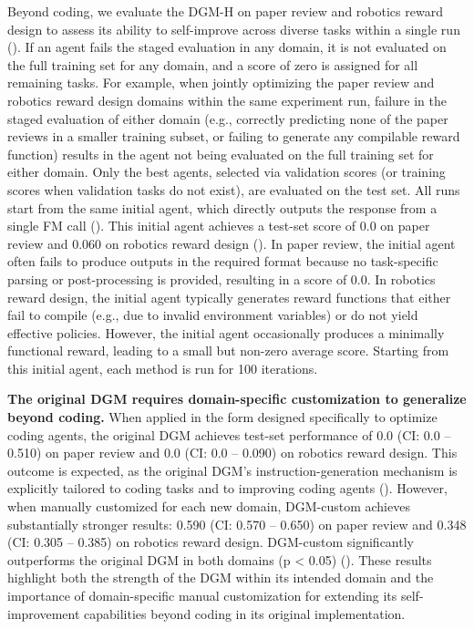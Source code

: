 \documentclass[]{fairmeta}
\begin{document}
Beyond coding, we evaluate the DGM-H on paper review and robotics reward design to assess its ability to self-improve across diverse tasks within a single run (). If an agent fails the staged evaluation in any domain, it is not evaluated on the full training set for any domain, and a score of zero is assigned for all remaining tasks. For example, when jointly optimizing the paper review and robotics reward design domains within the same experiment run, failure in the staged evaluation of either domain (e.g., correctly predicting none of the paper reviews in a smaller training subset, or failing to generate any compilable reward function) results in the agent not being evaluated on the full training set for either domain. Only the best agents, selected via validation scores (or training scores when validation tasks do not exist), are evaluated on the test set.
All runs start from the same initial agent, which directly outputs the response from a single FM call (). This initial agent achieves a test-set score of 0.0 on paper review and 0.060 on robotics reward design (). In paper review, the initial agent often fails to produce outputs in the required format because no task-specific parsing or post-processing is provided, resulting in a score of 0.0. In robotics reward design, the initial agent typically generates reward functions that either fail to compile (e.g., due to invalid environment variables) or do not yield effective policies. However, the initial agent occasionally produces a minimally functional reward, leading to a small but non-zero average score. Starting from this initial agent, each method is run for 100 iterations.

\textbf{The original DGM requires domain-specific customization to generalize beyond coding.} When applied in the form designed specifically to optimize coding agents, the original DGM achieves test-set performance of 0.0 (CI: 0.0 – 0.510) on paper review and 0.0 (CI: 0.0 – 0.090) on robotics reward design. This outcome is expected, as the original DGM's instruction-generation mechanism is explicitly tailored to coding tasks and to improving coding agents (). However, when manually customized for each new domain, DGM-custom achieves substantially stronger results: 0.590 (CI: 0.570 – 0.650) on paper review and 0.348 (CI: 0.305 – 0.385) on robotics reward design. DGM-custom significantly outperforms the original DGM in both domains (p < 0.05) (). These results highlight both the strength of the DGM within its intended domain and the importance of domain-specific manual customization for extending its self-improvement capabilities beyond coding in its original implementation.
\end{document}
